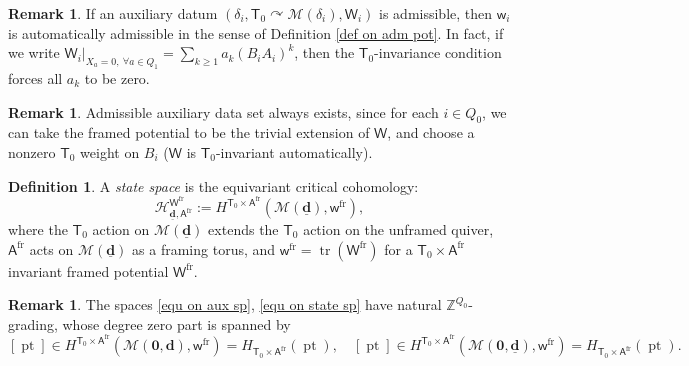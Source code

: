 \documentclass[10pt]{amsart}
\theoremstyle{definition}
\newtheorem{Definition}[Theorem]{Definition}
\newtheorem{Remark}[Theorem]{Remark}
\numberwithin{equation}{section}
\newcommand{\bd}{\mathbf{d}}
\newcommand{\cH}{\mathcal{H}}
\newcommand{\cM}{\mathcal{M}}
\newcommand{\sA}{\mathsf{A}}
\newcommand{\sT}{\mathsf{T}}
\newcommand{\sW}{\mathsf{W}}
\newcommand{\sw}{\mathsf{w}}
\newcommand{\pt}{\operatorname{pt}}
\newcommand{\tr}{\operatorname{tr}}
\begin{document}
\begin{Remark}
If an auxiliary datum $(\delta_i,\sT_0\curvearrowright\cM(\delta_i),\sW_i)$ is admissible, then $\sw_i$ is automatically admissible in the sense of Definition \ref{def on adm pot}. In fact, if we write $\sW_i\big|_{X_a=0,\:\forall a\in Q_1}=\sum_{k\geqslant 1}a_k (B_iA_i)^k$, then the $\sT_0$-invariance condition forces all $a_k$ to be zero.
\end{Remark}


\begin{Remark}
Admissible auxiliary data set always exists, since for each $i\in Q_0$, we can take the framed potential to be the trivial extension of $\sW$, and choose a nonzero $\sT_0$ weight on $B_i$ ($\sW$ is $\sT_0$-invariant automatically).
\end{Remark}

\begin{Definition}\label{def state space}
A \textit{state space} is the equivariant critical cohomology: 
\begin{equation}\label{equ on state sp}
    \cH^{\sW^{\mathrm{fr}}}_{\underline{\bd},\sA^{\mathrm{fr}}}:=H^{\sT_0\times \sA^{\mathrm{fr}}}(\cM(\underline{\bd}),\sw^{\mathrm{fr}}),
\end{equation}
where the $\sT_0$ action on $\cM(\underline{\bd})$ extends the $\sT_0$ action on the unframed quiver, $\sA^{\mathrm{fr}}$ acts on $\cM(\underline{\bd})$ as a framing torus, and $\sw^{\mathrm{fr}}=\tr(\sW^{\mathrm{fr}})$ for a $\sT_0\times \sA^{\mathrm{fr}}$ invariant framed potential $\sW^{\mathrm{fr}}$. 
\end{Definition}
\begin{Remark}
The spaces \eqref{equ on aux sp}, \eqref{equ on state sp} have natural $\mathbb{Z}^{Q_0}$-grading, whose degree zero part is spanned by 
$$ [\pt]\in H^{\sT_0\times \sA^{\mathrm{fr}}}\left(\cM(\mathbf 0,{\bd}),\sw^{\mathrm{fr}}\right)=H_{\sT_0\times \sA^{\mathrm{fr}}}(\pt), \quad 
 [\pt]\in H^{\sT_0\times \sA^{\mathrm{fr}}}\left(\cM(\mathbf 0,\underline{\bd}),\sw^{\mathrm{fr}}\right)=H_{\sT_0\times \sA^{\mathrm{fr}}}(\pt).$$
\end{Remark}
\end{document}
